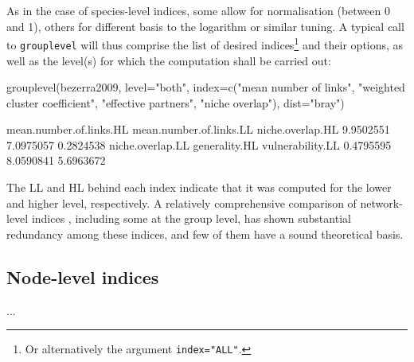 \documentclass[a4paper, 11pt]{article}\usepackage[]{graphicx}\usepackage[]{color}
\begin{document}
\noindent As in the case of species-level indices, some allow for normalisation (between 0 and 1), others for different basis to the logarithm or similar tuning. A typical call to \texttt{grouplevel} will thus comprise the list of desired indices\footnote{Or alternatively the argument \texttt{index="ALL"}.} and their options, as well as the level(s) for which the computation shall be carried out:
\begin{Schunk}
\begin{Sinput}
grouplevel(bezerra2009, level="both", index=c("mean number of links", "weighted 
     cluster coefficient", "effective partners", "niche overlap"), dist="bray")
\end{Sinput}
\begin{Soutput}
mean.number.of.links.HL mean.number.of.links.LL        niche.overlap.HL 
              9.9502551               7.0975057               0.2824538 
       niche.overlap.LL           generality.HL        vulnerability.LL 
              0.4795595               8.0590841               5.6963672 
\end{Soutput}
\end{Schunk}
The LL and HL behind each index indicate that it was computed for the lower and higher level, respectively. A relatively comprehensive comparison of network-level indices \citep{Dormann2009}, including some at the group level, has shown substantial redundancy among these indices, and few of them have a sound theoretical basis.



\subsection{Node-level indices}\label{nodelevel}
...
\end{document}
